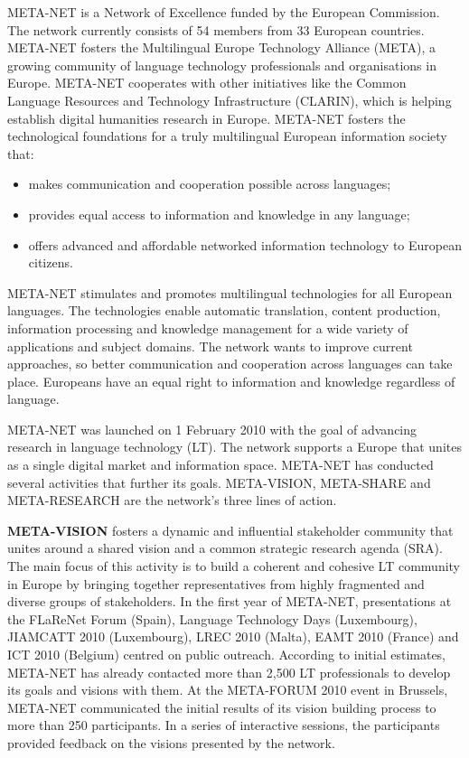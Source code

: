 \documentclass[]{../metanetpaper}
\begin{document}
\begin{multicols}{2}
META-NET is a Network of Excellence funded by the European Commission. The network currently consists of 54 members from 33 European countries. META-NET fosters the Multilingual Europe Technology Alliance (META), a growing community of language technology professionals and organisations in Europe. META-NET cooperates with other initiatives like the Common Language Resources and Technology Infrastructure (CLARIN), which is helping establish digital humanities research in Europe. META-NET fosters the technological foundations for a truly multilingual European information society that:

\begin{itemize}
\item makes communication and cooperation possible across languages;
\item provides equal access to information and knowledge in any language;
\item offers advanced and affordable networked information technology to European citizens.
\end{itemize}

META-NET stimulates and promotes multilingual technologies for all European languages. The technologies enable automatic translation, content production, information processing and knowledge management for a wide variety of applications and subject domains. The network wants to improve current approaches, so better communication and cooperation across languages can take place. Europeans have an equal right to information and knowledge regardless of language.

META-NET was launched on 1 February 2010 with the goal of advancing research in language technology (LT). The network supports a Europe that unites as a single digital market and information space. META-NET has conducted several activities that further its goals. META-VISION, META-SHARE and META-RESEARCH are the network’s three lines of action.

\textbf{META-VISION} fosters a dynamic and influential stakeholder community that unites around a shared vision and a common strategic research agenda (SRA). The main focus of this activity is to build a coherent and cohesive LT community in Europe by bringing together representatives from highly fragmented and diverse groups of stakeholders. In the first year of META-NET, presentations at the FLaReNet Forum (Spain), Language Technology Days (Luxembourg), JIAMCATT 2010 (Luxembourg), LREC 2010 (Malta), EAMT 2010 (France) and ICT 2010 (Belgium) centred on public outreach. According to initial estimates, META-NET has already contacted more than 2,500 LT professionals to develop its goals and visions with them. At the META-FORUM 2010 event in Brussels, META-NET communicated the initial results of its vision building process to more than 250 participants. In a series of interactive sessions, the participants provided feedback on the visions presented by the network. 


\end{multicols}
\end{document}
